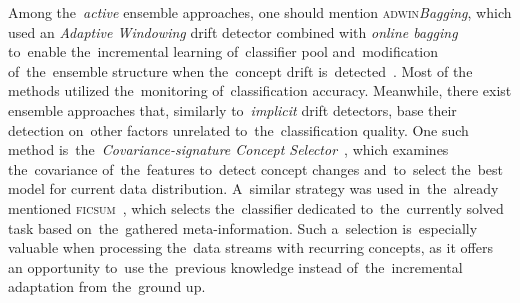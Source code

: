 Among the~\textit{active} ensemble approaches, one should mention \textsc{adwin}\textit{Bagging}, which used an \textit{Adaptive Windowing} drift detector combined with \textit{online bagging} to~enable the~incremental learning of~classifier pool and~modification of~the~ensemble structure when the~concept drift is~detected~\cite{bifet2009improving}. Most of the methods utilized the~monitoring of~classification accuracy. Meanwhile, there exist ensemble approaches that, similarly to~\textit{implicit} drift detectors, base their detection on~other factors unrelated to~the~classification quality. One such method is~the~\textit{Covariance-signature Concept Selector}~\cite{ksieniewicz2023processing}, which examines the~covariance of~the~features to~detect concept changes and~to~select the~best model for current data distribution. A~similar strategy was used in~the~already mentioned \textsc{ficsum}~\cite{halstead2023combining}, which selects the~classifier dedicated to~the~currently solved task based on~the~gathered meta-information. Such a~selection is~especially valuable when processing the~data streams with recurring concepts, as it offers an opportunity to~use the~previous knowledge instead of~the~incremental adaptation from the~ground up.